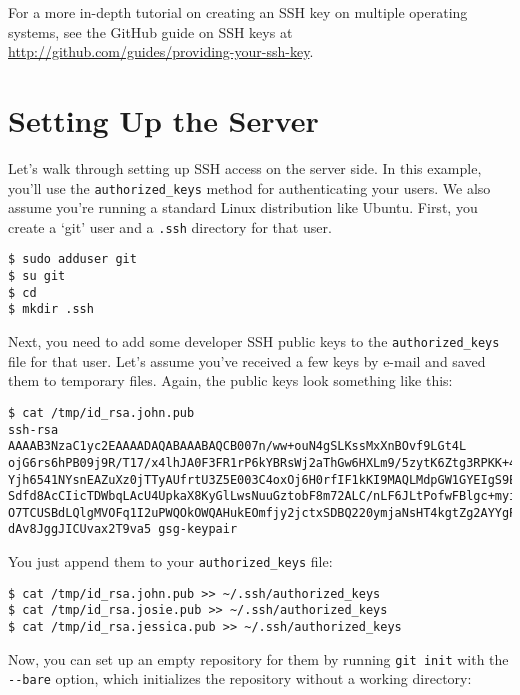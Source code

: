 \documentclass[a4paper]{book}
\begin{document}
For a more in-depth tutorial on creating an SSH key on multiple operating systems, see the GitHub guide on SSH keys at \url{http://github.com/guides/providing-your-ssh-key}.

\section{Setting Up the Server}

Let's walk through setting up SSH access on the server side. In this example, you'll use the \texttt{authorized\_keys} method for authenticating your users. We also assume you're running a standard Linux distribution like Ubuntu. First, you create a `git' user and a \texttt{.ssh} directory for that user.

\begin{shaded}\begin{verbatim}
$ sudo adduser git
$ su git
$ cd
$ mkdir .ssh
\end{verbatim}\end{shaded}

Next, you need to add some developer SSH public keys to the \texttt{authorized\_keys} file for that user. Let's assume you've received a few keys by e-mail and saved them to temporary files. Again, the public keys look something like this:

\begin{shaded}\begin{verbatim}
$ cat /tmp/id_rsa.john.pub
ssh-rsa AAAAB3NzaC1yc2EAAAADAQABAAABAQCB007n/ww+ouN4gSLKssMxXnBOvf9LGt4L
ojG6rs6hPB09j9R/T17/x4lhJA0F3FR1rP6kYBRsWj2aThGw6HXLm9/5zytK6Ztg3RPKK+4k
Yjh6541NYsnEAZuXz0jTTyAUfrtU3Z5E003C4oxOj6H0rfIF1kKI9MAQLMdpGW1GYEIgS9Ez
Sdfd8AcCIicTDWbqLAcU4UpkaX8KyGlLwsNuuGztobF8m72ALC/nLF6JLtPofwFBlgc+myiv
O7TCUSBdLQlgMVOFq1I2uPWQOkOWQAHukEOmfjy2jctxSDBQ220ymjaNsHT4kgtZg2AYYgPq
dAv8JggJICUvax2T9va5 gsg-keypair
\end{verbatim}\end{shaded}

You just append them to your \texttt{authorized\_keys} file:

\begin{shaded}\begin{verbatim}
$ cat /tmp/id_rsa.john.pub >> ~/.ssh/authorized_keys
$ cat /tmp/id_rsa.josie.pub >> ~/.ssh/authorized_keys
$ cat /tmp/id_rsa.jessica.pub >> ~/.ssh/authorized_keys
\end{verbatim}\end{shaded}

Now, you can set up an empty repository for them by running \texttt{git init} with the \texttt{-{}-bare} option, which initializes the repository without a working directory:
\end{document}

